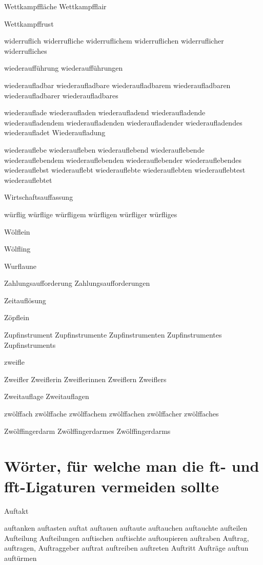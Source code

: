 Wettkampffläche Wettkampfflair 

Wettkampffrust

widerruflich widerrufliche widerruflichem widerruflichen widerruflicher widerrufliches

wiederaufführung wiederaufführungen

wiederaufladbar wiederaufladbare wiederaufladbarem wiederaufladbaren wiederaufladbarer wiederaufladbares 

wiederauflade wiederaufladen wiederaufladend wiederaufladende wiederaufladendem wiederaufladenden wiederaufladender wiederaufladendes wiederaufladet Wiederaufladung

wiederauflebe wiederaufleben wiederauflebend wiederauflebende wiederauflebendem wiederauflebenden wiederauflebender wiederauflebendes wiederauflebst wiederauflebt wiederauflebte wiederauflebten wiederauflebtest wiederauflebtet

Wirtschaftsauffassung


würflig würflige würfligem würfligen würfliger würfliges

Wölflein

Wölfling

Wurflaune

Zahlungsaufforderung Zahlungsaufforderungen

Zeitauflösung

Zöpflein

Zupfinstrument Zupfinstrumente Zupfinstrumenten Zupfinstrumentes Zupfinstruments

zweifle 

Zweifler Zweiflerin Zweiflerinnen Zweiflern Zweiflers

Zweitauflage Zweitauflagen

zwölffach zwölffache zwölffachem zwölffachen zwölffacher zwölffaches

Zwölffingerdarm Zwölffingerdarmes Zwölffingerdarms
  



\section*{Wörter, für welche man die ft- und fft-Ligaturen vermeiden sollte}

Auftakt

auftanken auftasten auftat
auftauen auftaute
auftauchen auftauchte
aufteilen Aufteilung Aufteilungen
auftischen auftischte auftoupieren
auftraben
Auftrag, auftragen, Auftraggeber
auftrat
auftreiben
auftreten
Auftritt
Aufträge
auftun auftürmen 

